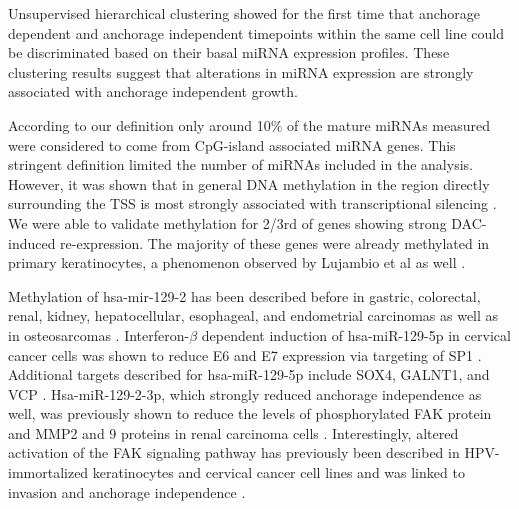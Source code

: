 Unsupervised hierarchical clustering showed for the first time that anchorage dependent and anchorage independent timepoints within the same cell line could be discriminated based on their basal miRNA expression profiles. These clustering results suggest that alterations in miRNA expression are strongly associated with anchorage independent growth.

According to our definition only around 10$\%$ of the mature miRNAs measured were considered to come from CpG-island associated miRNA genes. This stringent definition limited the number of miRNAs included in the analysis. However, it was shown that in general DNA methylation in the region directly surrounding the TSS is most strongly associated with transcriptional silencing \cite{Brenet2011}. We were able to validate methylation for 2/3rd of genes showing strong DAC-induced re-expression. The majority of these genes were already methylated in primary keratinocytes, a phenomenon observed by Lujambio et al as well \cite{Lujambio2008}. 

Methylation of hsa-mir-129-2 has been described before in gastric, colorectal, renal, kidney, hepatocellular, esophageal, and endometrial carcinomas as well as in osteosarcomas \cite{Anwar2013, Bandres2009, Chen2012, Chen2013, Huang2009, Long2015, Lu2013, Shen2010, Tsai2011}. Interferon-$\beta$ dependent induction of hsa-miR-129-5p in cervical cancer cells was shown to reduce E6 and E7 expression via targeting of SP1 \cite{Zhang2013}. Additional targets described for hsa-miR-129-5p include SOX4, GALNT1, and VCP \cite{Chen2013, Huang2009, Long2015, Shen2010}. Hsa-miR-129-2-3p, which strongly reduced anchorage independence as well, was previously shown to reduce the levels of phosphorylated FAK protein and MMP2 and 9 proteins in renal carcinoma cells \cite{Chen2014}. Interestingly, altered activation of the FAK signaling pathway has previously been described in HPV-immortalized keratinocytes and cervical cancer cell lines and was linked to invasion and anchorage independence \cite{McCormack1997, Schwock2009, Srivastava2015}. 

